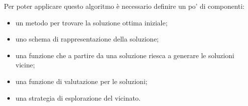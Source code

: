 Per poter applicare questo algoritmo è necessario definire un po' di componenti:

\begin{itemize}
	\item un metodo per trovare la soluzione ottima iniziale;
	\item uno schema di rappresentazione della soluzione;
	\item una funzione che a partire da una soluzione riesca a generare le soluzioni vicine;
	\item una funzione di valutazione per le soluzioni;
	\item una strategia di esplorazione del vicinato.
\end{itemize}






